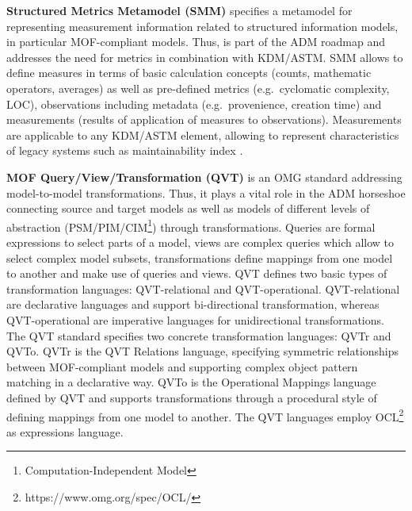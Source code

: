 \textbf{Structured Metrics Metamodel (SMM)} \autocite{OMG2012SMM} specifies a metamodel for representing measurement information related to structured information models, in particular MOF-compliant models.
Thus, is part of the ADM roadmap and addresses the need for metrics in combination with KDM/ASTM.
SMM allows to define measures in terms of basic calculation concepts (counts, mathematic operators, averages) as well as pre-defined metrics (e.g.~cyclomatic complexity, LOC), observations including metadata (e.g.~provenience, creation time) and measurements (results of application of measures to observations).
Measurements are applicable to any KDM/ASTM element, allowing to represent characteristics of legacy systems such as maintainability index \autocite{Coleman1994MaintainabilityIndex}.

\textbf{MOF Query/View/Transformation (QVT)} \autocite{OMG2016QVT} is an OMG standard addressing model-to-model transformations.
Thus, it plays a vital role in the ADM horseshoe connecting source and target models as well as models of different levels of abstraction (PSM/PIM/CIM\footnote{Computation-Independent Model}) through transformations.
Queries are formal expressions to select parts of a model, views are complex queries which allow to select complex model subsets, transformations define mappings from one model to another and make use of queries and views.
QVT defines two basic types of transformation languages: QVT-relational and QVT-operational.
QVT-relational are declarative languages and support bi-directional transformation, whereas QVT-operational are imperative languages for unidirectional transformations.
The QVT standard specifies two concrete transformation languages: QVTr and QVTo.
QVTr is the QVT Relations language, specifying symmetric relationships between MOF-compliant models and supporting complex object pattern matching in a declarative way.
QVTo is the Operational Mappings language defined by QVT and supports transformations through a procedural style of defining mappings from one model to another.
The QVT languages employ OCL\footnote{https://www.omg.org/spec/OCL/} as expressions language.

